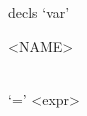 \documentclass[convert={outext=.png}]{standalone}
\begin{document}
\begin{málrit}{decls}
	`var'
	\begin{rep}
		<NAME>
		\begin{stack}
          \\
          `=' <expr>
		\end{stack}
	\end{rep}
\end{málrit}
\end{document}
